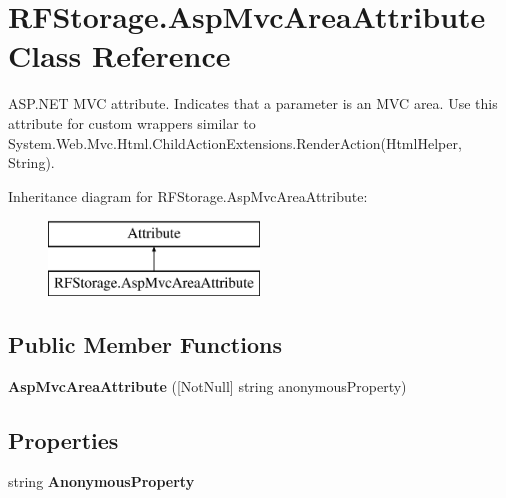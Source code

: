 \hypertarget{class_r_f_storage_1_1_asp_mvc_area_attribute}{}\section{R\+F\+Storage.\+Asp\+Mvc\+Area\+Attribute Class Reference}
\label{class_r_f_storage_1_1_asp_mvc_area_attribute}


A\+S\+P.\+N\+ET M\+VC attribute. Indicates that a parameter is an M\+VC area. Use this attribute for custom wrappers similar to {\ttfamily System.\+Web.\+Mvc.\+Html.\+Child\+Action\+Extensions.\+Render\+Action(\+Html\+Helper, String)}.  


Inheritance diagram for R\+F\+Storage.\+Asp\+Mvc\+Area\+Attribute\+:\begin{figure}[H]
\begin{center}
\leavevmode
\includegraphics[height=2.000000cm]{class_r_f_storage_1_1_asp_mvc_area_attribute}
\end{center}
\end{figure}
\subsection*{Public Member Functions}
\begin{DoxyCompactItemize}
\item 
\mbox{\label{class_r_f_storage_1_1_asp_mvc_area_attribute_ade663f3abec301cd185099f54427df44}} 
{\bfseries Asp\+Mvc\+Area\+Attribute} (\mbox{[}Not\+Null\mbox{]} string anonymous\+Property)
\end{DoxyCompactItemize}
\subsection*{Properties}
\begin{DoxyCompactItemize}
\item 
\mbox{\label{class_r_f_storage_1_1_asp_mvc_area_attribute_ac8c45a8ce481b9404005ed64f87fe9ee}} 
string {\bfseries Anonymous\+Property}
\end{DoxyCompactItemize}


